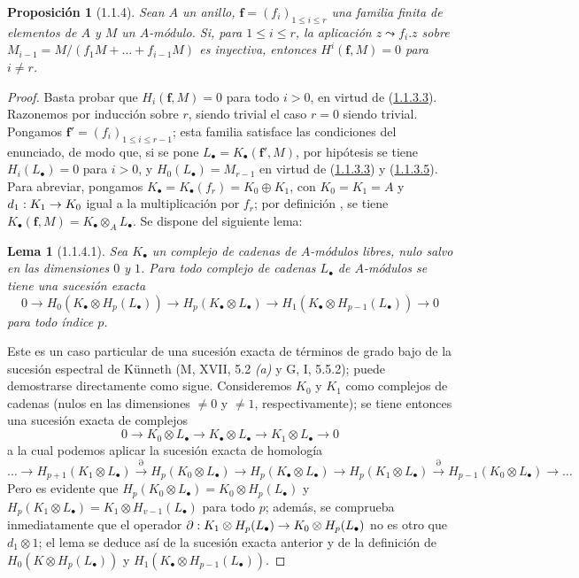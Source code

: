 \documentclass[10pt,oneside,openany]{book}
\theoremstyle{egaenv}\newtheorem*{env}{---}
\theoremstyle{egastatement}
\newtheorem*{proposition}{Proposición}
\newtheorem*{lemma}{Lema}
\theoremstyle{egadescription}
\newcommand{\oldpage}[2][]{\marginnote{\normalfont\scriptsize\textbf{#1}\,|\,#2}\ignorespaces}
\renewcommand{\leq}{\leqslant}
\renewcommand{\to}{\mathchoice{\longrightarrow}{\rightarrow}{\rightarrow}{\rightarrow}}
\begin{document}
\begin{proposition}[1.1.4]
\label{III.1.1.4}
\label{III.1.1.4-fr}
Sean $A$ un anillo, $\mathbf f=(f_i)_{1\leq i\leq r}$ una familia finita de elementos de $A$ y $M$ un $A$-módulo.
Si, para $1\leq i\leq r$, la aplicación $z\leadsto f_i.z$ sobre $M_{i-1}=M/(f_1M+\ldots+f_{i-1}M)$ es inyectiva, entonces $H^i(\mathbf f,M)=0$ para $i\neq r$.
\end{proposition}

\begin{proof}
Basta probar que $H_i(\mathbf f,M)=0$ para todo $i>0$, en virtud de (\hyperref[III.1.1.3.3]{1.1.3.3}).
Razonemos por inducción sobre $r$, siendo trivial el caso $r=0$ siendo trivial. Pongamos $\mathbf f'=(f_i)_{1\leq i\leq r-1}$; esta familia satisface las condiciones del enunciado, de modo que, si se pone $L_\bullet=K_\bullet(\mathbf f',M)$, por hipótesis se tiene $H_i(L_\bullet)=0$ para $i>0$, y $H_0(L_\bullet)=M_{r-1}$ en virtud de (\hyperref[III.1.1.3.3]{1.1.3.3}) y (\hyperref[III.1.1.3.5]{1.1.3.5}).
Para abreviar, pongamos $K_\bullet=K_\bullet(f_r)=K_0\oplus K_1$, con $K_0=K_1=A$ y $d_1:K_1\to K_0$ igual a la multiplicación por $f_r$; por definición , se tiene $K_\bullet(\mathbf f,M)=K_\bullet\otimes_A L_\bullet$.
Se dispone del siguiente lema:

\begin{lemma}[1.1.4.1]
\label{III.1.1.4.1}
\label{III.1.1.4.1-fr}
Sea $K_\bullet$ un complejo de cadenas de $A$-módulos libres, nulo salvo en las dimensiones $0$ y $1$.
Para todo complejo de cadenas $L_\bullet$ de $A$-módulos se tiene una sucesión exacta
\[
0\longrightarrow H_0(K_\bullet\otimes H_p(L_\bullet))
\longrightarrow H_p(K_\bullet\otimes L_\bullet)
\longrightarrow H_1(K_\bullet\otimes H_{p-1}(L_\bullet))
\longrightarrow0
\]
para todo índice $p$.
\end{lemma}

\oldpage[III]{84}
Este es un caso particular de una sucesión exacta de términos de grado bajo de la sucesión espectral de K\"unneth (M, XVII, 5.2 \emph{(a)} y G, I, 5.5.2); puede demostrarse directamente como sigue.
Consideremos $K_0$ y $K_1$ como complejos de cadenas (nulos en las dimensiones $\neq0$ y $\neq1$, respectivamente); se tiene entonces una sucesión exacta de complejos
\[
0\longrightarrow K_0\otimes L_\bullet
\longrightarrow K_\bullet\otimes L_\bullet
\longrightarrow K_1\otimes L_\bullet\longrightarrow0
\] a la cual podemos aplicar la sucesión exacta de homología \[
\ldots\longrightarrow H_{p+1}(K_1\otimes L_\bullet)
\xrightarrow{\partial}H_p(K_0\otimes L_\bullet)
\longrightarrow H_p(K_\bullet\otimes L_\bullet)
\longrightarrow H_p(K_1\otimes L_\bullet)
\xrightarrow{\partial}H_{p-1}(K_0\otimes L_\bullet)
\longrightarrow\ldots
\]
Pero es evidente que $H_p(K_0\otimes L_\bullet)=K_0\otimes H_p(L_\bullet)$ y $H_p(K_1\otimes L_\bullet)=K_1\otimes H_{v-1}(L_\bullet)$ para todo $p$; además, se comprueba inmediatamente que el operador $\partial:K_1\otimes H_p(L_\bullet)\to K_0\otimes H_p(L_\bullet)$ no es otro que $d_1\otimes1$; el lema se deduce así de la sucesión exacta anterior y de la definición de $H_0(K\otimes H_p(L_\bullet))$ y $H_1(K_\bullet\otimes H_{p-1}(L_\bullet))$.


\end{proof}
\end{document}
